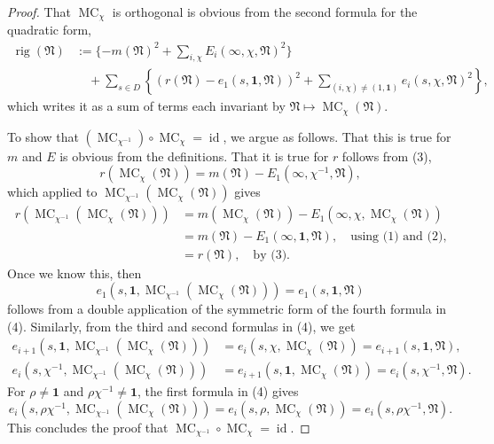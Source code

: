\begin{proof}
That \(\operatorname{MC}_\chi\) is orthogonal is obvious from the second formula for the quadratic form,
\[
\begin{aligned}
\operatorname{rig}(\mathfrak{N})
&:=\{-m(\mathfrak{N})^2+\sum_{i,\chi}E_i(\infty,\chi,\mathfrak{N})^2\}\\
&\quad+\sum_{s\in D}\left\{(r(\mathfrak{N})-e_1(s,\mathbf{1},\mathfrak{N}))^2
+\sum_{(i,\chi)\ne(1,\mathbf{1})}e_i(s,\chi,\mathfrak{N})^2\right\},
\end{aligned}
\]
which writes it as a sum of terms each invariant by \(\mathfrak{N}\mapsto\operatorname{MC}_\chi(\mathfrak{N})\).

To show that \((\operatorname{MC}_{\chi^{-1}})\circ\operatorname{MC}_\chi=\operatorname{id}\), we argue as follows. That this is true for \(m\) and \(E\) is obvious from the definitions. That it is true for \(r\) follows from (3),
\[
r(\operatorname{MC}_\chi(\mathfrak{N}))=m(\mathfrak{N})-E_1(\infty,\chi^{-1},\mathfrak{N}),
\]
which applied to \(\operatorname{MC}_{\chi^{-1}}(\operatorname{MC}_\chi(\mathfrak{N}))\) gives
\[
\begin{aligned}
r(\operatorname{MC}_{\chi^{-1}}(\operatorname{MC}_\chi(\mathfrak{N})))
&=m(\operatorname{MC}_\chi(\mathfrak{N}))-E_1(\infty,\chi,\operatorname{MC}_\chi(\mathfrak{N}))\\
&=m(\mathfrak{N})-E_1(\infty,\mathbf{1},\mathfrak{N}),\quad\text{using (1) and (2),}\\
&=r(\mathfrak{N}),\quad\text{by (3).}
\end{aligned}
\]
Once we know this, then
\[
e_1(s,\mathbf{1},\operatorname{MC}_{\chi^{-1}}(\operatorname{MC}_\chi(\mathfrak{N})))=e_1(s,\mathbf{1},\mathfrak{N})
\]
follows from a double application of the symmetric form of the fourth formula in (4). Similarly, from the third and second formulas in (4), we get
\[
\begin{aligned}
e_{i+1}(s,\mathbf{1},\operatorname{MC}_{\chi^{-1}}(\operatorname{MC}_\chi(\mathfrak{N})))&=e_i(s,\chi,\operatorname{MC}_\chi(\mathfrak{N}))=e_{i+1}(s,\mathbf{1},\mathfrak{N}),\\
e_i(s,\chi^{-1},\operatorname{MC}_{\chi^{-1}}(\operatorname{MC}_\chi(\mathfrak{N})))&=e_{i+1}(s,\mathbf{1},\operatorname{MC}_\chi(\mathfrak{N}))=e_i(s,\chi^{-1},\mathfrak{N}).
\end{aligned}
\]
For \(\rho\ne\mathbf{1}\) and \(\rho\chi^{-1}\ne\mathbf{1}\), the first formula in (4) gives
\[
e_i(s,\rho\chi^{-1},\operatorname{MC}_{\chi^{-1}}(\operatorname{MC}_\chi(\mathfrak{N})))=e_i(s,\rho,\operatorname{MC}_\chi(\mathfrak{N}))=e_i(s,\rho\chi^{-1},\mathfrak{N}).
\]
This concludes the proof that \(\operatorname{MC}_{\chi^{-1}}\circ\operatorname{MC}_\chi=\operatorname{id}\).


\end{proof}
